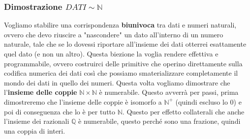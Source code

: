 \documentclass{article}
\begin{document}
\subsubsection{Dimostrazione $DATI\sim\mathbb{N}$}
Vogliamo stabilire una corrispondenza \textbf{biunivoca} tra dati e numeri naturali, ovvero
che devo riuscire a "nascondere" un dato all'interno di un numero naturale, tale che
se lo dovessi riportare all'insieme dei dati otterrei esattamente quel dato (e non un altro).
\newline\newline
Questa biezione la voglia rendere effettiva e programmabile, ovvero costruirci delle primitive che
operino direttamente sulla codifica numerica dei dati così che possiamo smaterializzare completamente
il mondo dei dati in quello dei numeri.
\newline\newline
Questa volta vogliamo dimostrare che l'\textbf{insieme delle coppie} $\mathbb{N}\times\mathbb{N}$
è numerabile. Questo avverrà per passi, prima dimostreremo che l'insieme delle coppie è isomorfo a
$\mathbb{N}^+$ (quindi escluso lo $0$) e poi di conseguenza che lo è per tutto $\mathbb{N}$.
Questo per effetto collaterali che anche l'insieme dei razionali $\mathbb{Q}$ è numerabile,
questo perché sono una frazione, quindi una coppia di interi.
\end{document}
